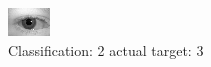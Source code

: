 \begin{figure}[h!]
\begin{center}
\includegraphics[width=0.60\columnwidth]{figures/ID562_class_2_target_3.png}
\end{center}
\caption{ Classification: 2 actual target: 3}
\label{fig:ID562_class_2_target_3}
\end{figure}

